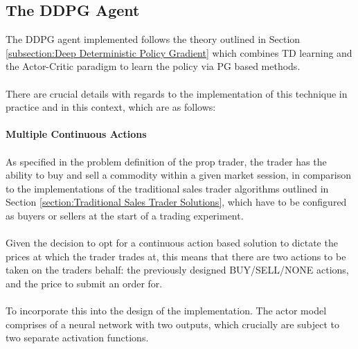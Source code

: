 \documentclass[ %
                    author={Ashwinder Khurana},
                supervisor={Prof Dave Cliff},
                    degree={MEng},
                     title={The Deeply Reinforced Trader},
                  subtitle={},
                      type={enterprise},
                      year={2020} ]{dissertation}
\begin{document}
{\subsection{The DDPG Agent}
The DDPG agent implemented follows the theory outlined in Section \ref{subsection:Deep Deterministic Policy Gradient} which combines TD learning and the Actor-Critic paradigm to learn the policy via PG based methods. 
\\
\\
\noindent
There are crucial details with regards to the implementation of this technique in practice and in this context, which are as follows:
\\
\\
\textbf{Multiple Continuous Actions}
\\
\\
\noindent
As specified in the problem definition of the prop trader, the trader has the ability to buy and sell a commodity within a given market session, in comparison to the implementations of the traditional sales trader algorithms outlined in Section \ref{section:Traditional Sales Trader Solutions}, which have to be configured as buyers or sellers at the start of a trading experiment. 
\\
\\
Given the decision to opt for a continuous action based solution to dictate the prices at which the trader trades at, this means that there are two actions to be taken on the traders behalf: the previously designed BUY/SELL/NONE actions, and the price to submit an order for. 
\\
\\
To incorporate this into the design of the implementation. The actor model comprises of a neural network with two outputs, which crucially are subject to two separate activation functions. 

}
\end{document}
